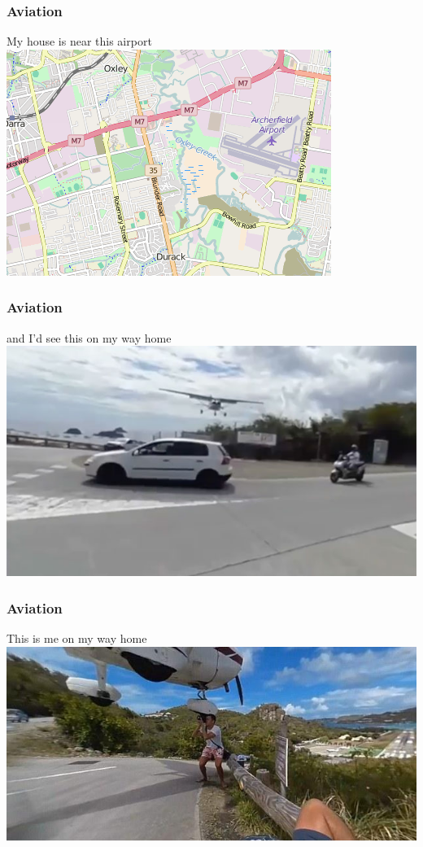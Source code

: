 \begin{frame}
\frametitle{Aviation}
\begin{block}{My house is near this airport}
\includegraphics[height=0.5\textheight]{image/archerfield-map.png}
\end{block}
\end{frame}

\begin{frame}
\frametitle{Aviation}
\begin{block}{and I'd see this on my way home}
\includegraphics[height=0.5\textheight]{image/aeroplane-approach.jpg}
\end{block}
\end{frame}

\begin{frame}
\frametitle{Aviation}
\begin{block}{This is me on my way home}
\includegraphics[height=0.5\textheight]{image/aeroplane-graze-photographer.jpg}
\end{block}
\end{frame}

